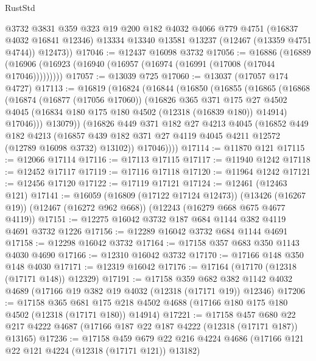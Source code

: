 \begin{lexlean}{RustStd}
\begin{coremodule}
        @3732
        @3831
        @359
        @323
        @19
        @200
        @182
        @4032
        @4066
        @779
        @4751
        (@16837 @4032 @16841 @12346)
        @13334
        @13340
        @13581
        @13237
        (@12467 (@13359 @4751 @4744))
        @12473))
@17046 := @12437 @16098 @3732
@17056 := @16886
    (@16889 (@16906 (@16923 (@16940 (@16957 (@16974 (@16991 (@17008 (@17044 @17046)))))))))
@17057 := @13039 @725
@17060 := @13037 (@17057 @174 @4727)
@17113 := @16819
    (@16824
      (@16844
        (@16850
          (@16855
            (@16865
              (@16868
                (@16874
                  (@16877 (@17056 @17060))
                  (@16826
                    @365
                    @371
                    @175
                    @27
                    @4502
                    @4045
                    (@16834 @180 @175 @180 @4502 (@12318 (@16839 @180)) @14914)
                    @17046)))
              @13079))
          (@16826
            @449
            @371
            @182
            @27
            @4213
            @4045
            (@16852
              @449
              @182
              @4213
              (@16857 @439 @182 @371 @27 @4119 @4045 @4211 @12572 (@12789 @16098 @3732) @13102))
            @17046))))
@17114 := @11870 @121
@17115 := @12066 @17114
@17116 := @17113 @17115
@17117 := @11940 @1242
@17118 := @12452 @17117
@17119 := @17116 @17118
@17120 := @11964 @1242
@17121 := @12456 @17120
@17122 := @17119 @17121
@17124 := @12461 (@12463 @121)
@17141 := @16059
    (@16809 (@17122 @17124 @12473))
    (@13426 (@16267 @19))
    (@12467 (@16272 @962 @668))
    (@12243 (@16279 @668 @675 @4677 @4119))
@17151 := @12275 @16042 @3732 @187 @684 @1144 @382 @4119 @4691 @3732 @1226
@17156 := @12289 @16042 @3732 @684 @1144 @4691
@17158 := @12298 @16042 @3732
@17164 := @17158 @357 @683 @350 @1143 @4030 @4690
@17166 := @12310 @16042 @3732
@17170 := @17166 @148 @350 @148 @4030
@17171 := @12319 @16042
@17176 := @17164 (@17170 (@12318 (@17171 @148)) @12329)
@17191 := @17158
    @359
    @682
    @382
    @1142
    @4032
    @4689
    (@17166 @19 @382 @19 @4032 (@12318 (@17171 @19)) @12346)
@17206 := @17158
    @365
    @681
    @175
    @218
    @4502
    @4688
    (@17166 @180 @175 @180 @4502 (@12318 (@17171 @180)) @14914)
@17221 := @17158
    @457
    @680
    @22
    @217
    @4222
    @4687
    (@17166 @187 @22 @187 @4222 (@12318 (@17171 @187)) @13165)
@17236 := @17158
    @459
    @679
    @22
    @216
    @4224
    @4686
    (@17166 @121 @22 @121 @4224 (@12318 (@17171 @121)) @13182)

\end{coremodule}
\end{lexlean}
